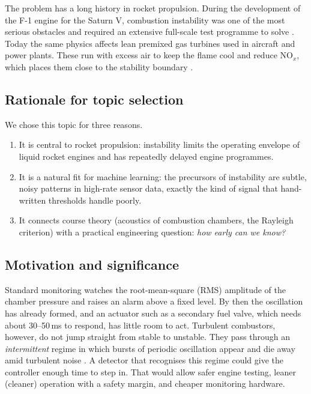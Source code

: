 \documentclass[11pt,a4paper]{article}
\begin{document}
The problem has a long history in rocket propulsion. During the development of the F-1 engine for the Saturn V, combustion instability was one of the most serious obstacles and required an extensive full-scale test programme to solve \cite{oefelein1993}. Today the same physics affects lean premixed gas turbines used in aircraft and power plants. These run with excess air to keep the flame cool and reduce NO$_x$, which places them close to the stability boundary \cite{lieuwen2005,dowling2003}.

\subsection{Rationale for topic selection}
We chose this topic for three reasons.
\begin{enumerate}
  \item It is central to rocket propulsion: instability limits the operating envelope of liquid rocket engines and has repeatedly delayed engine programmes.
  \item It is a natural fit for machine learning: the precursors of instability are subtle, noisy patterns in high-rate sensor data, exactly the kind of signal that hand-written thresholds handle poorly.
  \item It connects course theory (acoustics of combustion chambers, the Rayleigh criterion) with a practical engineering question: \emph{how early can we know?}
\end{enumerate}

\subsection{Motivation and significance}
Standard monitoring watches the root-mean-square (RMS) amplitude of the chamber pressure and raises an alarm above a fixed level. By then the oscillation has already formed, and an actuator such as a secondary fuel valve, which needs about 30--50\,ms to respond, has little room to act. Turbulent combustors, however, do not jump straight from stable to unstable. They pass through an \emph{intermittent} regime in which bursts of periodic oscillation appear and die away amid turbulent noise \cite{nair2014}. A detector that recognises this regime could give the controller enough time to step in. That would allow safer engine testing, leaner (cleaner) operation with a safety margin, and cheaper monitoring hardware.
\end{document}
